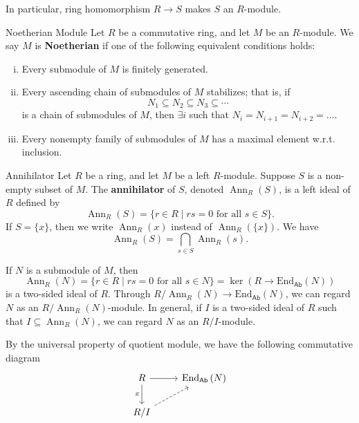 In particular, ring homomorphism $R\to S$ makes $S$ an $R$-module.

\begin{definition}{Noetherian Module}{}
Let $R$ be a commutative ring, and let $M$ be an $R$-module. We say $M$ is \textbf{Noetherian} if one of the following equivalent conditions holds:
\begin{enumerate}[(i)]
    \item Every submodule of $M$ is finitely generated.
    \item Every ascending chain of submodules of $M$ stabilizes; that is, if
    $$
    N_1 \subseteq N_2 \subseteq N_3 \subseteq \cdots
    $$
    is a chain of submodules of $M$, then $\exists i$ such that $N_i=N_{i+1}=N_{i+2}=\ldots$.
    \item Every nonempty family of submodules of $M$ has a maximal element w.r.t. inclusion.
\end{enumerate}
\end{definition}


\begin{definition}{Annihilator}{}
    Let $R$ be a ring, and let $M$ be a left $R$-module. Suppose $S$ is a non-empty subset of $M$. The \textbf{annihilator} of $S$, denoted $\operatorname{Ann}_R(S)$, is a left ideal of $R$ defined by 
    $$
    \operatorname{Ann}_R(S)=\{r \in R \mid r s=0 \text { for all } s \in S\}.
    $$
    If $S=\{ x \}$, then we write $\operatorname{Ann}_R(x)$ instead of $\operatorname{Ann}_R(\{ x \})$. We have
    $$
    \operatorname{Ann}_R(S)=\bigcap_{s \in S} \operatorname{Ann}_R(s).
    $$
\end{definition}

\begin{proposition}{}{}
    If $N$ is a submodule of $M$, then 
    \[
        \operatorname{Ann}_R(N)=\{r \in R \mid r s=0 \text { for all } s \in N\}=\ker \left(R\longrightarrow\mathrm{End}_{\mathsf{Ab}}\left(N\right)\right)  
    \]
    is a two-sided ideal of $R$. Through $R/\operatorname{Ann}_R(N)\to \mathrm{End}_{\mathsf{Ab}}\left(N\right)$, we can regard $N$ as an $R/\operatorname{Ann}_R(N)$-module. In general, if $I$ is a two-sided ideal of $R$ such that $I\subseteq \operatorname{Ann}_R(N)$, we can regard $N$ as an $R/I$-module.
\end{proposition}
\begin{prf}
    By the universal property of quotient module, we have the following commutative diagram
    \[
        \begin{tikzcd}
            R \arrow[r] \arrow[d, "\pi"'] & \mathrm{End}_{\mathsf{Ab}}\left(N\right) \\
            R/I \arrow[ru, dashed]        &                                         
            \end{tikzcd}
    \]
\end{prf}

